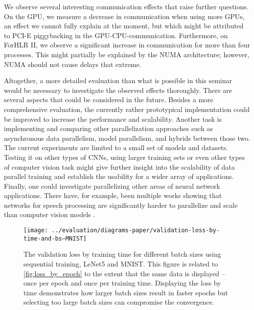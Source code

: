 \documentclass[conference,compsoc,a4paper]{IEEEtran}
\begin{document}
We observe several interesting communication effects that raise further questions.
On the GPU, we measure a decrease in communication when using more GPUs, an effect we cannot fully explain at the moment, but which might be attributed to PCI-E piggybacking in the GPU-CPU-communication.
Furthermore, on ForHLR II, we observe a significant increase in communication for more than four processes.
This might partially be explained by the NUMA architecture; however, NUMA should not cause delays that extreme.

Altogether, a more detailed evaluation than what is possible in this seminar would be necessary to investigate the observed effects thoroughly.
There are several aspects that could be considered in the future.
Besides a more comprehensive evaluation, the currently rather prototypical implementation could be improved to increase the performance and scalability.
Another task is implementing and comparing other parallelization approaches such as asynchronous data parallelism, model parallelism, and hybrids between those two.
%
The current experiments are limited to a small set of models and datasets.
Testing it on other types of CNNs, using larger training sets or even other types of computer vision task might give further insight into the scalability of data parallel training and establish the usability for a wider array of applications.
%
Finally, one could investigate parallelizing other areas of neural network applications.
There have, for example, been multiple works showing that networks for speech processing are significantly harder to parallelize and scale than computer vision models \cite{seide2014-Speech-DNNs,seide2014-1-bit-stochastic,dean2012-Large-scale-distributed}.








\begin{figure}[!t]
\centering
\texttt{[image: ../evaluation/diagrams-paper/validation-loss-by-time-and-bs--MNIST]}
\caption{The validation loss by training time for different batch sizes using sequential training, LeNet5 and MNIST.
This figure is related to \autoref{fig:loss_by_epoch} to the extent that the same data is displayed -- once per epoch and once per training time.
Displaying the loss by time demonstrates how larger batch sizes result in faster epochs but selecting too large batch sizes can compromise the convergence.}
\label{fig:loss_by_time}
\end{figure}
\end{document}
